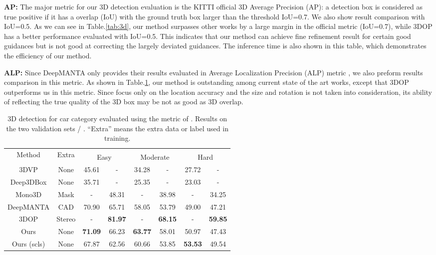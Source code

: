 \documentclass[10pt,twocolumn,letterpaper]{article}
\begin{document}
\textbf{AP:} 
The major metric for our 3D detection evaluation is the KITTI official 3D Average Precision (AP): a detection box is considered as true positive if it has a overlap (IoU) with the ground truth box larger than the threshold IoU=0.7. We also show result comparison with IoU=0.5. As we can see in Table.\ref{tab:3d}, our method surpasses other works by a large margin in the official metric (IoU=0.7), while 3DOP has a better performance evaluated with IoU=0.5. This indicates that our method can achieve fine refinement result for certain good guidances but is not good at correcting the largely deviated guidances. The inference time is also shown in this table, which demonstrates the efficiency of our method.

\textbf{ALP:} 
Since DeepMANTA only provides their results evaluated in Average Localization Precision (ALP) metric \cite{deepmanta}, we also preform results comparison in this metric. As shown in Table.\ref{tab:loc}, our method is outstanding among current state of the art works, except that 3DOP outperforms us in this metric. Since  focus only on the location accuracy and the size and rotation is not taken into consideration, its ability of reflecting the true quality of the 3D box may be not as good as 3D overlap. 

\begin{table}[!ht]
\begin{center}
\linespread{1.2}
\setlength{\tabcolsep}{1mm}
\footnotesize
\begin{tabular}{| c | c || c@{/}c | c@{/}c | c@{/}c |}
\hline
\multirow{2}{*}{Method} & \multirow{2}{*}{Extra} & \multicolumn{6}{c|}{} \\
\cline{3-8}
& & \multicolumn{2}{c|}{Easy} & \multicolumn{2}{c|}{Moderate} & \multicolumn{2}{c|}{Hard}  \\
\hline
3DVP \cite{3dvp} & None & 45.61 & - & 34.28 & - & 27.72 & - \\
Deep3DBox \cite{deep3dbox} & None & 35.71 & - & 25.35 & - & 23.03 & - \\
Mono3D \cite{mono3d} & Mask & - & 48.31 & - & 38.98 & - & 34.25 \\
DeepMANTA \cite{deepmanta} & CAD & 70.90 & 65.71 & 58.05 & 53.79 & 49.00 & 47.21 \\
3DOP \cite{3dop} & Stereo & - & \textbf{81.97} & - & \textbf{68.15} & - & \textbf{59.85} \\
\hline
Ours & None & \textbf{71.09} & 66.23 & \textbf{63.77} & 58.01 & 50.97 & 47.43 \\
Ours (scls) & None & 67.87 & 62.56 & 60.66 & 53.85 & \textbf{53.53} & 49.54 \\
\hline
\end{tabular}
\vspace{0.5mm}
\caption{3D detection for car category evaluated using the metric of . Results on the two validation sets  / . ``Extra'' means the extra data or label used in training.}
\label{tab:loc}
\end{center}
\end{table}
\end{document}
